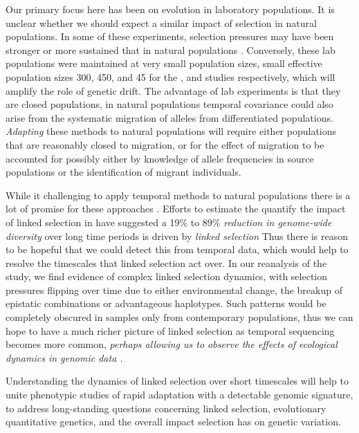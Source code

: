 \documentclass[11pt]{article}
\newcommand{\vb}[1]{{\it \color{blue} #1}}
\begin{document}
Our primary focus here has been on evolution in laboratory populations. It is
unclear whether we should expect a similar impact of selection in natural
populations. In some of these experiments, selection pressures may have been
stronger or more sustained that in natural populations
\vb{\parencite{Hendry1999-zu,Hairston2005-ga}}. Conversely, these lab
populations were maintained at very small population sizes, small effective
population sizes 300, 450, and 45 for the \textcite{Kelly2019-dc}, and
\textcite{Castro2019-uk} studies respectively, which will amplify the role of
genetic drift. The advantage of lab experiments is that they are closed
populations, in natural populations temporal covariance could also arise from
the systematic migration of alleles from differentiated populations.
\vb{Adapting} these methods to natural populations will require either
populations that are reasonably closed to migration, or for the effect of
migration to be accounted for possibly either by knowledge of allele
frequencies in source populations or the identification of migrant individuals. 

While it challenging to apply temporal methods to natural populations there is
a lot of promise for these approaches
\parencite{Bergland2014-ij,Machado2018-cs}. Efforts to estimate the quantify
the impact of linked selection in have suggested a 19\% to 89\% \vb{reduction
in genome-wide diversity} over long time periods is driven by \vb{linked
selection}
\parencite{McVicker2009-ax,Elyashiv2016-vt,Corbett-Detig2015-gt,Coop2016-gx,Comeron2014-nh}
Thus there is reason to be hopeful that we could detect this from temporal
data, which would help to resolve the timescales that linked selection act
over. In our reanalysis of the \textcite{Barghi2019-qy} study, we find evidence
of complex linked selection dynamics, with selection pressures flipping over
time due to either environmental change, the breakup of epistatic combinations
or advantageous haplotypes. Such patterns would be completely obscured in
samples only from contemporary populations, thus we can hope to have a much
richer picture of linked selection as temporal sequencing becomes more common,
\vb{perhaps allowing us to observe the effects of ecological dynamics in
genomic data \parencite{Hairston2005-ga}.}

Understanding the dynamics of linked selection over short timescales will help
to unite phenotypic studies of rapid adaptation with a detectable genomic
signature, to address long-standing questions concerning linked selection,
evolutionary quantitative genetics, and the overall impact selection has on
genetic variation. 
\end{document}
